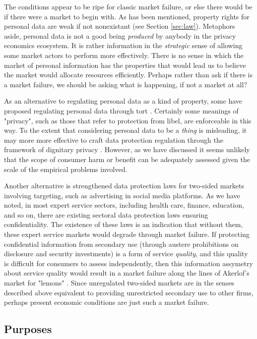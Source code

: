 \documentclass[../thesis.tex]{subfiles}
\begin{document}
The conditions appear to be ripe for classic market failure,
or else there would be if there were a market to begin
with.
As has been mentioned, property rights for
personal data are weak if not nonexistant (see Section \ref{sec:law}).
Metaphors aside, personal data is not a good being
\textit{produced} by anybody
in the privacy economics ecosystem.
It is rather information in the \emph{strategic} sense of
allowing some market actors to perform more effectively.
There is no sense in which the market of personal information
has the properties that would lead us to believe the
market would allocate resources efficiently.
Perhaps rather than ask if there is a market failure,
we should be asking what is happening, if not a market at all?

As an alternative to regulating personal data as a kind of property,
some have proposed regulating personal data through tort
\cite{posner1981economics, cofone2017dynamic}.
Certainly some meanings of "privacy", such as those that refer
to protection from libel, are enforceable in this way.
To the extent that considering personal data to be a \textit{thing}
is misleading, it may more more
effective to craft data protection regulation through
the framework of dignitary privacy \cite{post2017data}. 
However, as we have discussed it seems unlikely that the scope
of consumer harm or benefit can be adequately assessed given the
scale of the empirical problems involved.

Another alternative is strengthened
data protection laws for two-sided markets involving targeting,
such as advertising in social media platforms.
As we have noted, in most expert service sectors, including
health care, finance, education, and so on, there are existing
sectoral data protection laws ensuring confidentiality.
The existence of these laws is an indication that without
them, these expert service markets would degrade through
market failure.
If protecting confidential information from secondary use
(through austere prohibitions on disclosure and security
investments) is a form of service \emph{quality}, and this quality
is difficult for consumers to assess independently, then
this information assymetry about service quality would result
in a market failure along the lines of Akerlof's market for
"lemons" \cite{akerlof1970market}. 
Since unregulated two-sided markets are in the senses described
above equivalent to providing unrestricted secondary use to
other firms, perhaps present economic conditions are just such
a market failure.

\subsection{Purposes}
\end{document}
